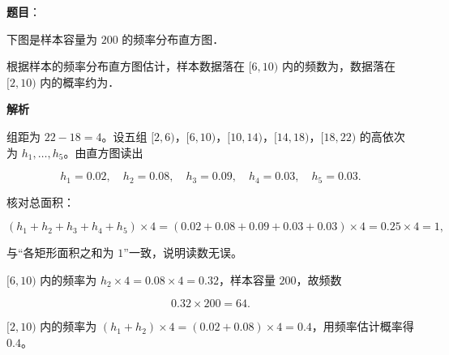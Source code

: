 \begin{answer}

\textbf{题目}：

下图是样本容量为 $200$ 的频率分布直方图．
\nopagebreak[4]
\begin{center}\end{center}
\nopagebreak[4]
根据样本的频率分布直方图估计，样本数据落在 $[6,10)$ 内的频数为\gkblank{}，数据落在 $[2,10)$ 内的概率约为\gkblank{}．

\textbf{解析}

组距为 $22-18=4$。设五组 $[2,6)$，$[6,10)$，$[10,14)$，$[14,18)$，$[18,22)$ 的高依次为 $h_1,\dots,h_5$。由直方图读出

\nopagebreak[4]
\[h_1=0.02,\quad h_2=0.08,\quad h_3=0.09,\quad h_4=0.03,\quad h_5=0.03.\]

核对总面积：

\nopagebreak[4]
\[(h_1+h_2+h_3+h_4+h_5)\times4=(0.02+0.08+0.09+0.03+0.03)\times4=0.25\times4=1,\]

与“各矩形面积之和为 $1$”一致，说明读数无误。

$[6,10)$ 内的频率为 $h_2\times4=0.08\times4=0.32$，样本容量 $200$，故频数

\nopagebreak[4]
\[0.32\times200=64.\]

$[2,10)$ 内的频率为 $(h_1+h_2)\times4=(0.02+0.08)\times4=0.4$，用频率估计概率得 $0.4$。


\end{answer}
